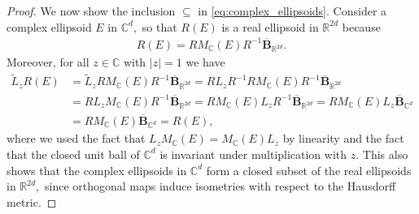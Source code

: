 \documentclass[10pt,a4paper]{amsart}
\newcommand{\complex}{\mathbb{C}}
\newcommand{\reals}{\mathbb{R}}
\begin{document}
\begin{proof}
	We now show the inclusion $\subseteq$ in \eqref{eq:complex_ellipsoids}. Consider a complex ellipsoid $E$ in $\complex^{d},$ so that $R(E)$ is a real ellipsoid in $\reals^{2d}$ because
	\begin{align*}
		R(E) = RM_{\complex}(E)R^{-1}\mathbf{\overline{B}}_{\reals^{2d}}.
	\end{align*}
    Moreover, for all $z\in\complex$ with $|z|=1$ we have
     \begin{align*}
     	\widetilde{L}_{z}R(E) &= \widetilde{L}_{z}RM_{\complex}(E)R^{-1}\mathbf{\overline{B}}_{\reals^{2d}} = RL_{z}R^{-1}RM_{\complex}(E)R^{-1}\mathbf{\overline{B}}_{\reals^{2d}}\\
     	&= RL_{z}M_{\complex}(E)R^{-1}\mathbf{\overline{B}}_{\reals^{2d}} = RM_{\complex}(E)L_{z}R^{-1}\mathbf{\overline{B}}_{\reals^{2d}}
     	= RM_{\complex}(E)L_{z}\mathbf{\overline{B}}_{\complex^{d}}\\
     	&=
     	RM_{\complex}(E)\mathbf{\overline{B}}_{\complex^d} = R(E),
     \end{align*}
    where we used the fact that $L_{z}M_{\complex}(E) = M_{\complex}(E)L_{z}$ by linearity and the fact that the closed unit ball of $\complex^{d}$ is invariant under multiplication with $z.$
    This also shows that the complex ellipsoids in $\complex^d$ form a closed subset of the real ellipsoids in $\reals^{2d},$
    since orthogonal maps induce isometries with respect to the Hausdorff metric.
    \end{proof}
\end{document}
